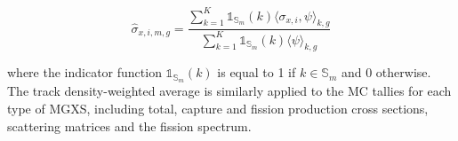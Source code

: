 \begin{equation}
\label{eqn:lns-micro}
\hat{\sigma}_{x,i,m,g} = \frac{\displaystyle\sum\limits_{k=1}^{K}\mathbb{1}_{\mathbb{S}_{m}}(k) \langle \sigma_{x,i}, \psi \rangle_{k,g}}{\displaystyle\sum\limits_{k=1}^{K}\mathbb{1}_{\mathbb{S}_{m}}(k) \langle \psi \rangle_{k,g}}
\end{equation}

\noindent where the indicator function $\mathbb{1}_{\mathbb{S}_{m}}(k)$ is equal to 1 if $k \in \mathbb{S}_{m}$ and 0 otherwise. The track density-weighted average is similarly applied to the MC tallies for each type of MGXS, including total, capture and fission production cross sections, scattering matrices and the fission spectrum.
